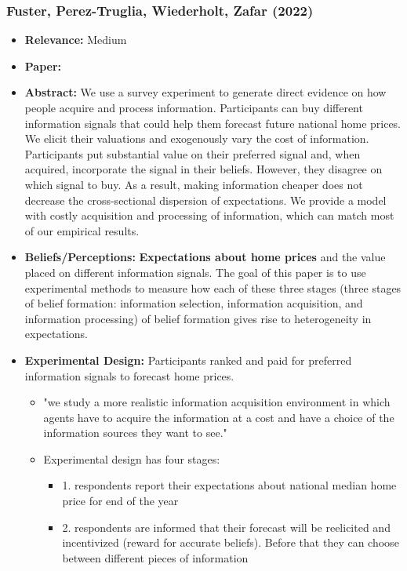 \documentclass[a4paper, 12pt]{article}
\begin{document}
\subsubsection*{Fuster, Perez-Truglia, Wiederholt, Zafar (2022)}
\begin{itemize}
    \item \textbf{Relevance:} Medium
    \item \textbf{Paper:} 
    \item \textbf{Abstract:} We use a survey experiment to generate direct evidence on how people acquire and process information. Participants can buy different information signals that could help them forecast future national home prices. We elicit their valuations and exogenously vary the cost of information. Participants put substantial value on their preferred signal and, when acquired, incorporate the signal in their beliefs. However, they disagree on which signal to buy. As a result, making information cheaper does not decrease the cross-sectional dispersion of expectations. We provide a model with costly acquisition and processing of information, which can match most of our empirical results.
    \item \textbf{Beliefs/Perceptions:} \textbf{Expectations about home prices} and the value placed on different information signals. The goal of this paper is to use experimental methods to measure how each of these three stages (three stages of belief formation: information selection, information acquisition, and information processing) of belief formation gives rise to heterogeneity in expectations.
    \item \textbf{Experimental Design:} Participants ranked and paid for preferred information signals to forecast home prices.
    \begin{itemize}
        \item "we study a more realistic information acquisition environment in which agents have to acquire the information at a cost and have a choice of the information sources they want to see."
        \item Experimental design has four stages: 
        \begin{itemize}
            \item 1. respondents report their expectations about national median home price for end of the year
            \item 2. respondents are informed that their forecast will be reelicited and incentivized (reward for accurate beliefs). Before that they can choose between different pieces of information

\end{itemize}
\end{itemize}
\end{itemize}
\end{document}
